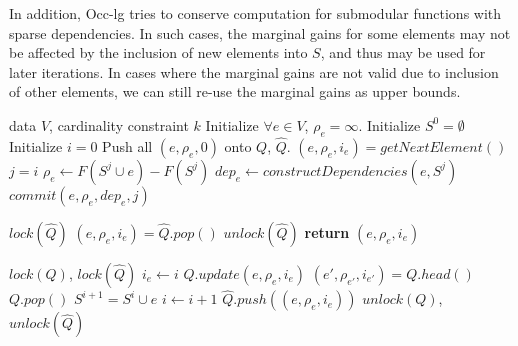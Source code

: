 \documentclass{article}
\newcommand{\occlz}{Occ-lg}
\begin{document}
In addition, \occlz{} tries to conserve computation for submodular functions with sparse dependencies.
In such cases, the marginal gains for some elements may not be affected by the inclusion of new elements into $S$, and thus may be used for later iterations.
In cases where the marginal gains are not valid due to inclusion of other elements, we can still re-use the marginal gains as upper bounds.
\begin{algorithm}[tb]
  \caption{Optimistic CC Lazy Greedy}
  \label{alg:scclz}
\begin{algorithmic}[1]
   data $V$, cardinality constraint $k$
  \STATE Initialize $\forall e \in V$, $\rho_e = \infty$.
  \STATE Initialize $S^0 = \emptyset$
  \STATE Initialize $i = 0$
  \STATE Push all $(e, \rho_e, 0)$ onto $Q$, $\widehat{Q}$.
      \STATE $(e, \rho_e, i_e) = getNextElement()$
      \STATE $j = i$
      \STATE $\rho_e     \leftarrow F(S^j \cup e) - F(S^j)$
      \STATE $dep_e \leftarrow constructDependencies(e, S^j)$
      \STATE $commit(e, \rho_e, dep_e, j)$
    \ENDWHILE
  \ENDFOR
\end{algorithmic}
\end{algorithm}

\begin{algorithm}[tb]
  \caption{$getNextElement()$}
  \label{alg:scclz:getnext}
\begin{algorithmic}
  \STATE $lock(\widehat{Q})$
  \STATE $(e, \rho_e, i_e) = \widehat{Q}.pop()$
  \STATE $unlock(\widehat{Q})$
  \STATE \textbf{return} $(e, \rho_e, i_e)$
\end{algorithmic}
\end{algorithm}


\begin{algorithm}[tb]
  \caption{OCC $commit(e, \rho_e, dep_e, i_e)$}
  \label{alg:scclz:commit}
\begin{algorithmic}
  \STATE $lock(Q)$, $lock(\widehat{Q})$
    \STATE $i_e \leftarrow i$
  \ENDIF
  \STATE $Q.update(e, \rho_e, i_e)$
  \STATE $(e', \rho_{e'}, i_{e'}) = Q.head()$
    \STATE $Q.pop()$
    \STATE $S^{i+1} = S^i \cup e$
    \STATE $i \leftarrow i + 1$
  \ELSE
    \STATE $\widehat{Q}.push((e, \rho_e, i_e))$
  \ENDIF
  \STATE $unlock(Q)$, $unlock(\widehat{Q})$
\end{algorithmic}
\end{algorithm}
\end{document}
